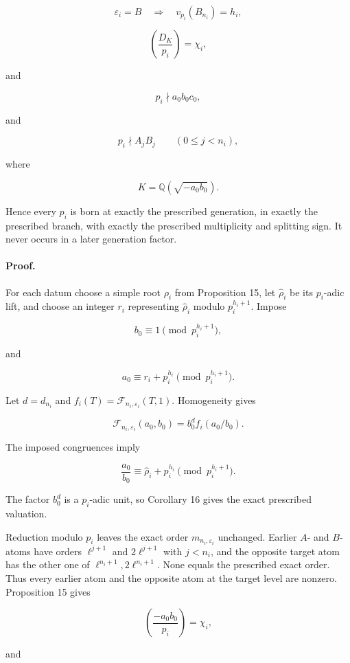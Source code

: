 \documentclass[11pt]{article}
\begin{document}
\[
\varepsilon_i=B
\quad\Longrightarrow\quad
v_{p_i}(B_{n_i})=h_i,
\]

\[
\left(\frac{D_K}{p_i}\right)
=
\chi_i,
\]

and

\[
p_i\nmid a_0b_0c_0,
\]

and

\[
p_i\nmid A_jB_j
\qquad
(0\leq j<n_i),
\]

where

\[
K=\mathbb Q(\sqrt{-a_0b_0}).
\]

Hence every \(p_i\) is born at exactly the prescribed generation, in
exactly the prescribed branch, with exactly the prescribed multiplicity
and splitting sign. It never occurs in a later generation factor.

\paragraph{Proof.}

For each datum choose a simple root \(\rho_i\) from Proposition 15, let
\(\widehat\rho_i\) be its \(p_i\)-adic lift, and choose an integer \(r_i\)
representing \(\widehat\rho_i\) modulo \(p_i^{h_i+1}\). Impose

\[
b_0
\equiv
1
\pmod{p_i^{h_i+1}},
\]

and

\[
a_0
\equiv
r_i+p_i^{h_i}
\pmod{p_i^{h_i+1}}.
\]

Let \(d=d_{n_i}\) and
\(f_i(T)=\mathcal F_{n_i,\varepsilon_i}(T,1)\). Homogeneity gives

\[
\mathcal F_{n_i,\varepsilon_i}(a_0,b_0)
=
b_0^d f_i(a_0/b_0).
\]

The imposed congruences imply

\[
\frac{a_0}{b_0}
\equiv
\widehat\rho_i+p_i^{h_i}
\pmod{p_i^{h_i+1}}.
\]

The factor \(b_0^d\) is a \(p_i\)-adic unit, so Corollary 16 gives the
exact prescribed valuation.

Reduction modulo \(p_i\) leaves the exact order
\(m_{n_i,\varepsilon_i}\) unchanged. Earlier \(A\)- and \(B\)-atoms have
orders \(\ell^{j+1}\) and \(2\ell^{j+1}\) with \(j<n_i\), and the opposite
target atom has the other one of
\(\ell^{n_i+1},2\ell^{n_i+1}\). None equals the prescribed exact order.
Thus every earlier atom and the opposite atom at the target level are
nonzero. Proposition 15 gives

\[
\left(\frac{-a_0b_0}{p_i}\right)
=
\chi_i,
\]

and
\end{document}

